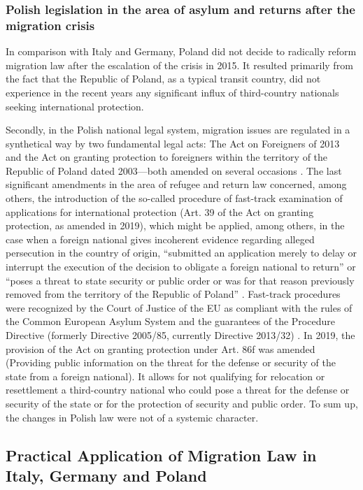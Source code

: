 \documentclass[10pt,a4paper]{article}
\begin{document}
\begin{multicols}{2}
\subsubsection{Polish legislation in the area of asylum and returns after the migration crisis}

\noindent In comparison with Italy and Germany, Poland did not decide to radically reform migration law after the escalation of the crisis in 2015. It resulted primarily from the fact that the Republic of Poland, as a typical transit country, did not experience in the recent years any significant influx of third-country nationals seeking international protection.

Secondly, in the Polish national legal system, migration issues are regulated in a synthetical way by two fundamental legal acts: The Act on Foreigners of 2013 and the Act on granting protection to foreigners within the territory of the Republic of Poland dated 2003---both amended on several occasions \citep{R68}. The last significant amendments in the area of refugee and return law concerned, among others, the introduction of the so-called procedure of fast-track examination of applications for international protection (Art. 39 of the Act on granting protection, as amended in 2019), which might be applied, among others, in the case when a foreign national gives incoherent evidence regarding alleged persecution in the country of origin, ``submitted an application merely to delay or interrupt the execution of the decision to obligate a foreign national to return'' or ``poses a threat to state security or public order or was for that reason previously removed from the territory of the Republic of Poland'' \citep{R69}. Fast-track procedures were recognized by the Court of Justice of the EU as compliant with the rules of the Common European Asylum System and the guarantees of the Procedure Directive (formerly Directive 2005/85, currently Directive 2013/32) \citep{R70}. In 2019, the provision of the Act on granting protection under Art. 86f was amended (Providing public information on the threat for the defense or security of the state from a foreign national). It allows for not qualifying for relocation or resettlement a third-country national who could pose a threat for the defense or security of the state or for the protection of security and public order. To sum up, the changes in Polish law were not of a systemic character.

\subsection{Practical Application of Migration Law in Italy, Germany and Poland}


\end{multicols}
\end{document}
